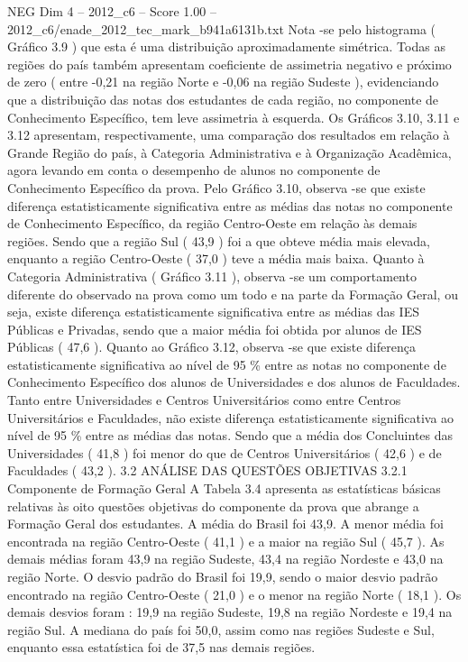 \begin{textsample}{NEG Dim 4 – 2012\_c6 – Score 1.00 – 2012\_c6/enade\_2012\_tec\_mark\_b941a6131b.txt}
Nota -se pelo histograma ( Gráfico 3.9 ) que esta é uma distribuição aproximadamente simétrica.
Todas as regiões do país também apresentam coeficiente de assimetria negativo e próximo de zero ( entre -0,21 na região Norte e -0,06 na região Sudeste ), evidenciando que a distribuição das notas dos estudantes de cada região, no componente de Conhecimento Específico, tem leve assimetria à esquerda.
Os Gráficos 3.10, 3.11 e 3.12 apresentam, respectivamente, uma comparação dos resultados em relação à Grande Região do país, à Categoria Administrativa e à Organização Acadêmica, agora levando em conta o desempenho de alunos no componente de Conhecimento Específico da prova.
Pelo Gráfico 3.10, observa -se que existe diferença estatisticamente significativa entre as médias das notas no componente de Conhecimento Específico, da região Centro-Oeste em relação às demais regiões.
Sendo que a região Sul ( 43,9 ) foi a que obteve média mais elevada, enquanto a região Centro-Oeste ( 37,0 ) teve a média mais baixa.
Quanto à Categoria Administrativa ( Gráfico 3.11 ), observa -se um comportamento diferente do observado na prova como um todo e na parte da Formação Geral, ou seja, existe diferença estatisticamente significativa entre as médias das IES Públicas e Privadas, sendo que a maior média foi obtida por alunos de IES Públicas ( 47,6 ).
Quanto ao Gráfico 3.12, observa -se que existe diferença estatisticamente significativa ao nível de 95 \% entre as notas no componente de Conhecimento Específico dos alunos de Universidades e dos alunos de Faculdades.
Tanto entre Universidades e Centros Universitários como entre Centros Universitários e Faculdades, não existe diferença estatisticamente significativa ao nível de 95 \% entre as médias das notas.
Sendo que a média dos Concluintes das Universidades ( 41,8 ) foi menor do que de Centros Universitários ( 42,6 ) e de Faculdades ( 43,2 ). 3.2 ANÁLISE DAS QUESTÕES OBJETIVAS 3.2.1 Componente de Formação Geral A Tabela 3.4 apresenta as estatísticas básicas relativas às oito questões objetivas do componente da prova que abrange a Formação Geral dos estudantes.
A média do Brasil foi 43,9.
A menor média foi encontrada na região Centro-Oeste ( 41,1 ) e a maior na região Sul ( 45,7 ).
As demais médias foram 43,9 na região Sudeste, 43,4 na região Nordeste e 43,0 na região Norte.
O desvio padrão do Brasil foi 19,9, sendo o maior desvio padrão encontrado na região Centro-Oeste ( 21,0 ) e o menor na região Norte ( 18,1 ).
Os demais desvios foram : 19,9 na região Sudeste, 19,8 na região Nordeste e 19,4 na região Sul.
A mediana do país foi 50,0, assim como nas regiões Sudeste e Sul, enquanto essa estatística foi de 37,5 nas demais regiões.

\end{textsample}
